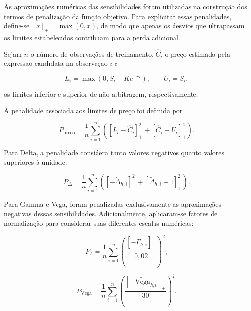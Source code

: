 As aproximações numéricas das sensibilidades foram utilizadas
na construção dos termos de penalização da função objetivo.
Para explicitar essas penalidades, define-se
$[x]_+ = \max(0,x)$, de modo que apenas os desvios
que ultrapassam os limites estabelecidos contribuam
para a perda adicional.

Sejam $n$ o número de observações de treinamento,
$\widehat{C}_i$ o preço estimado pela expressão candidata
na observação $i$ e

\begin{equation}
    L_i = \max\left(0,S_i-Ke^{-r\tau}\right),
    \qquad U_i = S_i,
\end{equation}

os limites inferior e superior de não arbitragem,
respectivamente.

A penalidade associada aos limites de preço foi definida por

\begin{equation}
\label{eq:penalidade_preco}
    P_{\mathrm{preco}} =
    \frac{1}{n}\sum_{i=1}^{n}
    \left(
        [L_i-\widehat{C}_i]_+^2
        +
        [\widehat{C}_i-U_i]_+^2
    \right).
\end{equation}

Para Delta, a penalidade considera tanto valores negativos
quanto valores superiores à unidade:

\begin{equation}
\label{eq:penalidade_delta}
    P_{\Delta} =
    \frac{1}{n}\sum_{i=1}^{n}
    \left(
        [-\widetilde{\Delta}_{h,i}]_+^2
        +
        [\widetilde{\Delta}_{h,i}-1]_+^2
    \right).
\end{equation}

Para Gamma e Vega, foram penalizadas exclusivamente
as aproximações negativas dessas sensibilidades.
Adicionalmente, aplicaram-se fatores de normalização
para considerar suas diferentes escalas numéricas:

\begin{equation}
\label{eq:penalidade_gamma}
    P_{\Gamma} =
    \frac{1}{n}\sum_{i=1}^{n}
    \left(
        \frac{[-\widetilde{\Gamma}_{h,i}]_+}
        {0{,}02}
    \right)^2,
\end{equation}

\begin{equation}
\label{eq:penalidade_vega}
    P_{\mathrm{Vega}} =
    \frac{1}{n}\sum_{i=1}^{n}
    \left(
        \frac{[-\widetilde{\mathrm{Vega}}_{h,i}]_+}
        {30}
    \right)^2.
\end{equation}

